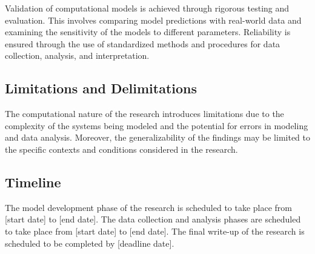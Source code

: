 Validation of computational models is achieved through rigorous testing and evaluation. This involves comparing model predictions with real-world data and examining the sensitivity of the models to different parameters. Reliability is ensured through the use of standardized methods and procedures for data collection, analysis, and interpretation.

\subsection{Limitations and Delimitations}

The computational nature of the research introduces limitations due to the complexity of the systems being modeled and the potential for errors in modeling and data analysis. Moreover, the generalizability of the findings may be limited to the specific contexts and conditions considered in the research.

\subsection{Timeline}

The model development phase of the research is scheduled to take place from [start date] to [end date]. The data collection and analysis phases are scheduled to take place from [start date] to [end date]. The final write-up of the research is scheduled to be completed by [deadline date].